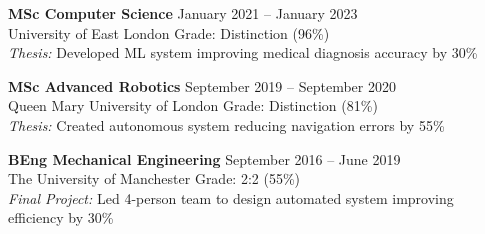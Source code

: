 \documentclass[10pt,a4paper]{article}
\begin{document}
\textbf{MSc Computer Science} \hfill January 2021 -- January 2023\\
University of East London \hfill Grade: Distinction (96\%)\\
\textit{Thesis:} Developed ML system improving medical diagnosis accuracy by 30\%

\textbf{MSc Advanced Robotics} \hfill September 2019 -- September 2020\\
Queen Mary University of London \hfill Grade: Distinction (81\%)\\
\textit{Thesis:} Created autonomous system reducing navigation errors by 55\%

\textbf{BEng Mechanical Engineering} \hfill September 2016 -- June 2019\\
The University of Manchester \hfill Grade: 2:2 (55\%)\\
\textit{Final Project:} Led 4-person team to design automated system improving efficiency by 30\%
\end{document}
